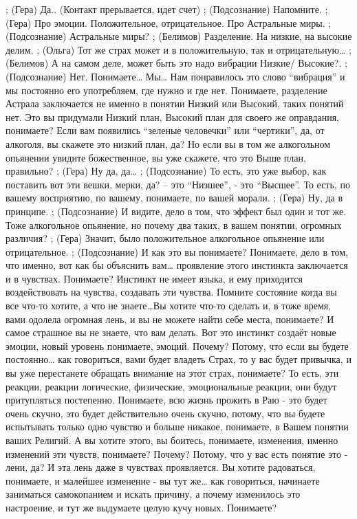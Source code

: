 ;	(Гера) Да..
(Контакт прерывается, идет счет)
;	(Подсознание) Напомните.
;	(Гера) Про эмоции. Положительное, отрицательное. Про Астральные миры.
;	(Подсознание) Астральные миры?
;	(Белимов) Разделение. На низкие, на высокие делим.
;	(Ольга) Тот же страх может и в положительную, так и отрицательную… 
;	(Белимов) А на самом деле, может быть это надо вибрации Низкие/ Высокие?.
;	(Подсознание)  Нет. Понимаете… Мы… Нам понравилось это слово ``вибрация'' и мы постоянно его употребляем, где нужно и где нет. Понимаете, разделение Астрала заключается не именно в понятии Низкий или Высокий, таких понятий нет. Это вы придумали Низкий план, Высокий план для своего же оправдания, понимаете? Если вам появились ``зеленые человечки'' или ``чертики'', да, от алкоголя, вы скажете это низкий план, да? Но если вы в том же алкогольном опьянении увидите божественное, вы уже скажете, что это Выше план, правильно? 
;	(Гера) Ну да, да…
;	(Подсознание) То есть, это уже выбор, как поставить вот эти вешки, мерки, да? – это ``Низшее'', - это ``Высшее''. То есть, по вашему восприятию, по вашему, понимаете, по вашей морали.
;	(Гера) Ну, да в принципе.
;	(Подсознание) И видите, дело в том, что эффект был один и тот же. Тоже алкогольное опьянение, но почему два таких, в вашем понятии, огромных различия? 
;	(Гера) Значит, было положительное алкогольное опьянение или отрицательное.
;	(Подсознание) И как это вы понимаете? Понимаете, дело в том, что именно, вот как бы объяснить вам…  проявление этого инстинкта заключается и в чувствах. Понимаете? Инстинкт не имеет языка, и ему приходится воздействовать на чувства, создавать эти чувства. Помните состояние когда вы все что-то хотите, а что не знаете…Вы хотите что-то сделать и, в тоже время, вами одолела огромная лень, и вы не можете найти себе места, понимаете? И самое страшное вы не знаете, что вам делать. Вот это инстинкт создаёт новые эмоции, новый уровень понимаете, эмоций. Почему? Потому, что если вы будете постоянно… как говориться, вами будет владеть Страх,  то у вас будет привычка, и вы уже перестанете обращать внимание на этот страх, понимаете? То есть, эти реакции, реакции логические, физические, эмоциональные реакции, они будут притупляться постепенно. Понимаете, всю жизнь прожить в Раю - это будет очень скучно, это будет действительно очень скучно, потому, что вы будете испытывать только одно чувство и больше никакое, понимаете, в Вашем понятии ваших Религий. А вы хотите этого, вы боитесь, понимаете, изменения, именно изменений эти чувств, понимаете? Почему? Потому, что у вас есть понятие это - лени, да? И эта лень даже в чувствах проявляется. Вы хотите радоваться, понимаете, и малейшее изменение - вы тут же… как говориться, начинаете заниматься самокопанием и искать причину, а почему изменилось это настроение, и тут же выдумаете целую кучу новых. Понимаете?
